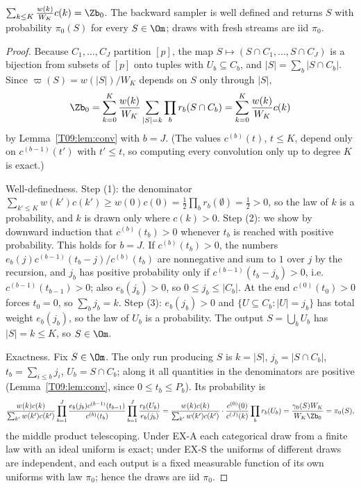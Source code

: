 \documentclass[11pt]{report}
\begin{document}
\begin{T09proposition}[Part (i)]
$\sum_{k\le K}\frac{w(k)}{W_K}c(k)=\Zb_0$. The backward sampler is well defined and returns $S$ with probability $\pi_0(S)$ for every $S\in\Om$; draws with fresh streams are iid $\pi_0$.
\end{T09proposition}
\begin{proof}
Because $C_1,\dots,C_J$ partition $[p]$, the map $S\mapsto(S\cap C_1,\dots,S\cap C_J)$ is a bijection from subsets of $[p]$ onto tuples with $U_b\subseteq C_b$, and $|S|=\sum_b|S\cap C_b|$. Since $\varpi(S)=w(|S|)/W_K$ depends on $S$ only through $|S|$,
\[\Zb_0=\sum_{k=0}^{K}\frac{w(k)}{W_K}\sum_{|S|=k}\prod_br_b(S\cap C_b)=\sum_{k=0}^K\frac{w(k)}{W_K}c(k)\]
by Lemma~\ref{T09:lem:conv} with $b=J$. (The values $c^{(b)}(t)$, $t\le K$, depend only on $c^{(b-1)}(t')$ with $t'\le t$, so computing every convolution only up to degree $K$ is exact.)

Well-definedness. Step (1): the denominator $\sum_{k'\le K}w(k')c(k')\ge w(0)c(0)=\tfrac12\prod_br_b(\emptyset)=\tfrac12>0$, so the law of $k$ is a probability, and $k$ is drawn only where $c(k)>0$. Step (2): we show by downward induction that $c^{(b)}(t_b)>0$ whenever $t_b$ is reached with positive probability. This holds for $b=J$. If $c^{(b)}(t_b)>0$, the numbers $e_b(j)c^{(b-1)}(t_b-j)/c^{(b)}(t_b)$ are nonnegative and sum to $1$ over $j$ by the recursion, and $j_b$ has positive probability only if $c^{(b-1)}(t_b-j_b)>0$, i.e.\ $c^{(b-1)}(t_{b-1})>0$; also $e_b(j_b)>0$, so $0\le j_b\le|C_b|$. At the end $c^{(0)}(t_0)>0$ forces $t_0=0$, so $\sum_bj_b=k$. Step (3): $e_b(j_b)>0$ and $\{U\subseteq C_b:|U|=j_b\}$ has total weight $e_b(j_b)$, so the law of $U_b$ is a probability. The output $S=\bigcup_bU_b$ has $|S|=k\le K$, so $S\in\Om$.

Exactness. Fix $S\in\Om$. The only run producing $S$ is $k=|S|$, $j_b=|S\cap C_b|$, $t_b=\sum_{i\le b}j_i$, $U_b=S\cap C_b$; along it all quantities in the denominators are positive (Lemma~\ref{T09:lem:conv}, since $0\le t_b\le P_b$). Its probability is
\[\frac{w(k)c(k)}{\sum_{k'}w(k')c(k')}\prod_{b=1}^J\frac{e_b(j_b)c^{(b-1)}(t_{b-1})}{c^{(b)}(t_b)}\prod_{b=1}^J\frac{r_b(U_b)}{e_b(j_b)}
=\frac{w(k)c(k)}{\sum_{k'}w(k')c(k')}\cdot\frac{c^{(0)}(0)}{c^{(J)}(k)}\prod_br_b(U_b)=\frac{\gamma_0(S)W_K}{W_K\Zb_0}=\pi_0(S),\]
the middle product telescoping. Under EX-A each categorical draw from a finite law with an ideal uniform is exact; under EX-S the uniforms of different draws are independent, and each output is a fixed measurable function of its own uniforms with law $\pi_0$; hence the draws are iid $\pi_0$.
\end{proof}
\end{document}
